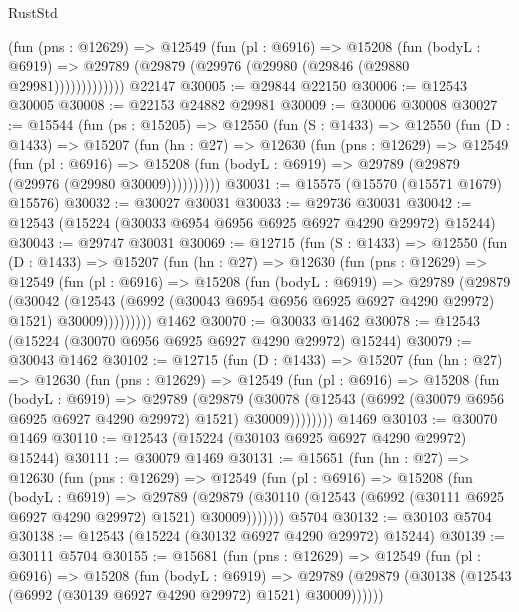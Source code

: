 \begin{lexlean}{RustStd}
\begin{coremodule}
              (fun (pns : @12629) =>
              @12549
                (fun (pl : @6916) =>
                @15208
                  (fun (bodyL : @6919) =>
                  @29789 (@29879 (@29976 (@29980 (@29846 (@29880 @29981)))))))))))))
    @22147
@30005 := @29844 @22150
@30006 := @12543 @30005
@30008 := @22153 @24882 @29981
@30009 := @30006 @30008
@30027 := @15544
    (fun (ps : @15205) =>
    @12550
      (fun (S : @1433) =>
      @12550
        (fun (D : @1433) =>
        @15207
          (fun (hn : @27) =>
          @12630
            (fun (pns : @12629) =>
            @12549
              (fun (pl : @6916) =>
              @15208 (fun (bodyL : @6919) => @29789 (@29879 (@29976 (@29980 @30009))))))))))
@30031 := @15575 (@15570 (@15571 @1679) @15576)
@30032 := @30027 @30031
@30033 := @29736 @30031
@30042 := @12543 (@15224 (@30033 @6954 @6956 @6925 @6927 @4290 @29972) @15244)
@30043 := @29747 @30031
@30069 := @12715
    (fun (S : @1433) =>
    @12550
      (fun (D : @1433) =>
      @15207
        (fun (hn : @27) =>
        @12630
          (fun (pns : @12629) =>
          @12549
            (fun (pl : @6916) =>
            @15208
              (fun (bodyL : @6919) =>
              @29789
                (@29879
                  (@30042
                    (@12543
                      (@6992 (@30043 @6954 @6956 @6925 @6927 @4290 @29972) @1521)
                      @30009)))))))))
    @1462
@30070 := @30033 @1462
@30078 := @12543 (@15224 (@30070 @6956 @6925 @6927 @4290 @29972) @15244)
@30079 := @30043 @1462
@30102 := @12715
    (fun (D : @1433) =>
    @15207
      (fun (hn : @27) =>
      @12630
        (fun (pns : @12629) =>
        @12549
          (fun (pl : @6916) =>
          @15208
            (fun (bodyL : @6919) =>
            @29789
              (@29879
                (@30078 (@12543 (@6992 (@30079 @6956 @6925 @6927 @4290 @29972) @1521) @30009))))))))
    @1469
@30103 := @30070 @1469
@30110 := @12543 (@15224 (@30103 @6925 @6927 @4290 @29972) @15244)
@30111 := @30079 @1469
@30131 := @15651
    (fun (hn : @27) =>
    @12630
      (fun (pns : @12629) =>
      @12549
        (fun (pl : @6916) =>
        @15208
          (fun (bodyL : @6919) =>
          @29789
            (@29879 (@30110 (@12543 (@6992 (@30111 @6925 @6927 @4290 @29972) @1521) @30009)))))))
    @5704
@30132 := @30103 @5704
@30138 := @12543 (@15224 (@30132 @6927 @4290 @29972) @15244)
@30139 := @30111 @5704
@30155 := @15681
    (fun (pns : @12629) =>
    @12549
      (fun (pl : @6916) =>
      @15208
        (fun (bodyL : @6919) =>
        @29789 (@29879 (@30138 (@12543 (@6992 (@30139 @6927 @4290 @29972) @1521) @30009))))))

\end{coremodule}
\end{lexlean}
